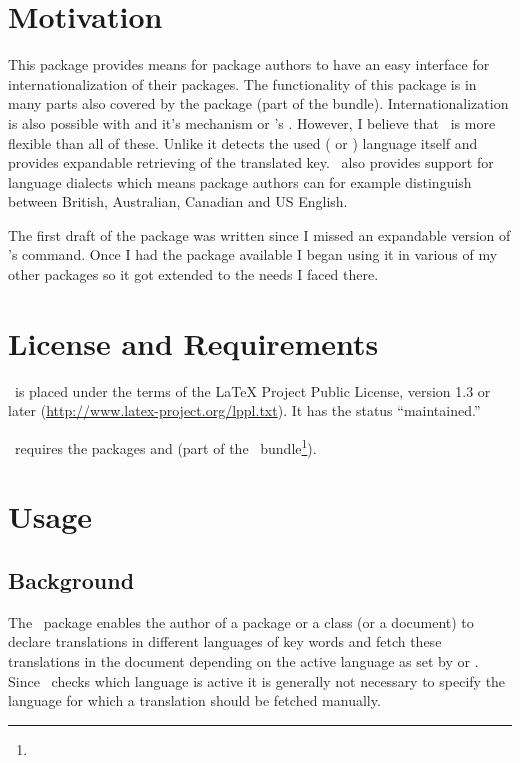 \documentclass[DIV11,toc=index,toc=bib,numbers=noendperiod]{cnpkgdoc}
\begin{document}
\section{Motivation}
This package provides means for package authors to have an easy interface for
internationalization of their packages.  The functionality of this package is
in many parts also covered by the package  (part of the
 bundle).  Internationalization is also possible with
 and it's  mechanism or
\KOMAScript's .  However, I believe that
\translations\ is more flexible than all of these.  Unlike 
it detects the used ( or ) language itself and
provides expandable retrieving of the translated key.  \translations\ also
provides support for language dialects which means package authors can for
example distinguish between British, Australian, Canadian and US English.

The first draft of the package was written since I missed an expandable
version of 's  command.  Once I had the
package available I began using it in various of my other packages so it got
extended to the needs I faced there.

\section{License and Requirements}\label{sec:license}
\translations\ is placed under the terms of the \LaTeX{} Project Public
License, version 1.3 or later (\url{http://www.latex-project.org/lppl.txt}).
It has the  status ``maintained.''

\translations\ requires the packages  and 
(part of the \KOMAScript\ bundle\footnote{}).

\section{Usage}
\subsection{Background}
The \translations\ package enables the author of a package or a class (or a
document) to declare translations in different languages of key words and
fetch these translations in the document depending on the active language as
set by  or .  Since \translations\ checks
which language is active it is generally not necessary to specify the language
for which a translation should be fetched manually.
\end{document}
